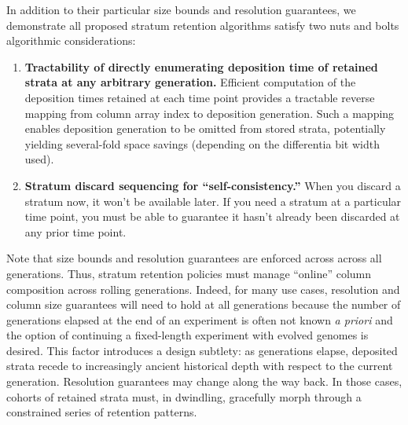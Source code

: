 In addition to their particular size bounds and resolution guarantees, we demonstrate all proposed stratum retention algorithms satisfy two nuts and bolts algorithmic considerations:
\begin{enumerate}
\item \textbf{Tractability of directly enumerating deposition time of retained strata at any arbitrary generation.} Efficient computation of the deposition times retained at each time point provides a tractable reverse mapping from column array index to deposition generation.
  Such a mapping enables deposition generation to be omitted from stored strata, potentially yielding several-fold space savings (depending on the differentia bit width used).

\item \textbf{Stratum discard sequencing for ``self-consistency.''} 
  When you discard a stratum now, it won't be available later.
  If you need a stratum at a particular time point, you must be able to guarantee it hasn't already been discarded at any prior time point.

\end{enumerate}


Note that size bounds and resolution guarantees are enforced across across all generations.
Thus, stratum retention policies must manage ``online'' column composition across rolling generations.
Indeed, for many use cases, resolution and column size guarantees will need to hold at all generations because the number of generations elapsed at the end of an experiment is often not known \textit{a priori} and the option of continuing a fixed-length experiment with evolved genomes is desired.
This factor introduces a design subtlety: as generations elapse, deposited strata recede to increasingly ancient historical depth with respect to the current generation.
Resolution guarantees may change along the way back.
In those cases, cohorts of retained strata must, in dwindling, gracefully morph through a constrained series of retention patterns.

